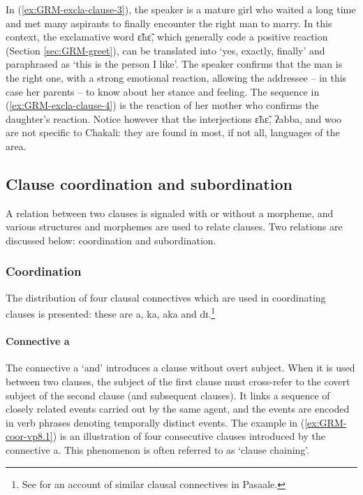 \z
\z

In  (\ref{ex:GRM-excla-clause-3}), the  speaker is a mature girl who waited a long time and met 
many aspirants to finally encounter the right man to marry. In this context, the exclamative word  
{\sls ɛ̃hɛ̃}, which generally code a positive reaction (Section \ref{sec:GRM-greet}),  can be 
translated into `yes, exactly, finally' and paraphrased as  `this is the person I like'.   The 
speaker confirms that the man is the right one, with a strong emotional reaction,  allowing the 
addressee -- in this case her parents -- to know about her stance and feeling. The sequence in  
(\ref{ex:GRM-excla-clause-4})  is the reaction of her mother who confirms the daughter's reaction. 
Notice however  that the interjections {\sls ɛ̃hɛ̃}, {\sls ʔabba}, and {\sls woo} are not specific 
to Chakali: they are found in most, if not all, languages of the area.



\subsection{Clause coordination and subordination}
\label{GRM-clause-coord-subord}

A relation between two clauses is signaled with or without a morpheme,  and 
various  structures and morphemes  are used to relate clauses.  Two
relations are discussed below: coordination and subordination. 

\subsubsection{Coordination}
\label{GRM-clause-coord}


The distribution of four clausal connectives which are used in coordinating
clauses is presented: these are {\sls a}, {\sls ka}, {\sls aka} and {\sls 
dɪ}.\footnote{See \citet[143--149]{Mcgi99} for an account of similar clausal
connectives in Pasaale.}  


\paragraph{Connective {\sls a}}
\label{GRM-clause-coord-a}


The connective {\sls a} `and'  introduces a clause without overt subject.  When 
it is used between two clauses, the subject of the first clause must 
cross-refer to the covert subject of the second clause  (and subsequent 
clauses). It links a sequence of closely related events carried out by the same 
agent, and the events are encoded in  verb phrases denoting temporally distinct 
events. The example in (\ref{ex:GRM-coor-vp8.1}) is  an illustration of four 
consecutive clauses introduced by the connective  {\sls a}.   This phenomenon 
is often referred to as `clause chaining'. 

